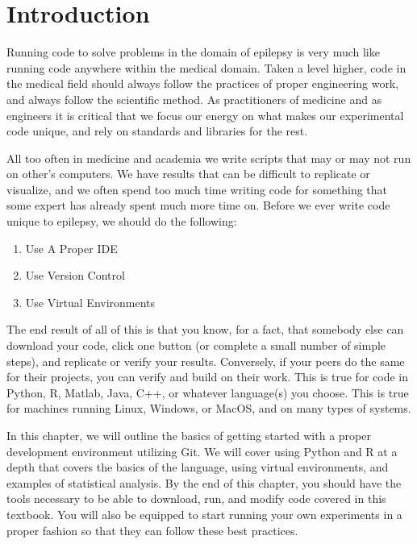 \section{Introduction}
Running code to solve problems in the domain of epilepsy is very much like running code anywhere within the medical domain.
Taken a level higher, code in the medical field should always follow the practices of proper engineering work, and always follow the scientific method.
As practitioners of medicine and as engineers it is critical that we focus our energy on what makes our experimental code unique, and rely on standards and libraries for the rest.

All too often in medicine and academia we write scripts that may or may not run on other's computers.
We have results that can be difficult to replicate or visualize, and we often spend too much time writing code for something that some expert has already spent much more time on.
Before we ever write code unique to epilepsy, we should do the following:
\begin{enumerate}
    \item Use A Proper IDE
    \item Use Version Control
    \item Use Virtual Environments
\end{enumerate}

The end result of all of this is that you know, for a fact, that somebody else can download your code, click one button (or complete a small number of simple steps), and replicate or verify your results.
Conversely, if your peers do the same for their projects, you can verify and build on their work.
This is true for code in Python, R, Matlab, Java, C++, or whatever language(s) you choose.
This is true for machines running Linux, Windows, or MacOS, and on many types of systems.

In this chapter, we will outline the basics of getting started with a proper development environment utilizing Git.
We will cover using Python and R at a depth that covers the basics of the language, using virtual environments, and examples of statistical analysis.
By the end of this chapter, you should have the tools necessary to be able to download, run, and modify code covered in this textbook.
You will also be equipped to start running your own experiments in a proper fashion so that they can follow these best practices.
